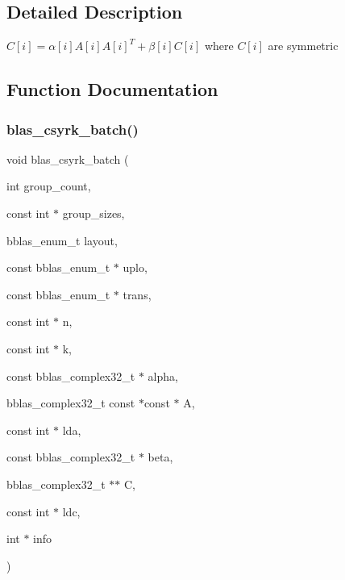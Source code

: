 \subsection{Detailed Description}
$ C[i] = \alpha[i] A[i] A[i]^T + \beta[i] C[i] $ where $ C[i] $ are symmetric 



\subsection{Function Documentation}
\mbox{\label{group__syrk__batch_ga94e86ba1afc5a916a21c81c36b69d7b8}} 
\subsubsection{\texorpdfstring{blas\+\_\+csyrk\+\_\+batch()}{blas\_csyrk\_batch()}}
{\footnotesize\ttfamily void blas\+\_\+csyrk\+\_\+batch (\begin{DoxyParamCaption}\item[{int}]{group\+\_\+count,  }\item[{const int $\ast$}]{group\+\_\+sizes,  }\item[{bblas\+\_\+enum\+\_\+t}]{layout,  }\item[{const bblas\+\_\+enum\+\_\+t $\ast$}]{uplo,  }\item[{const bblas\+\_\+enum\+\_\+t $\ast$}]{trans,  }\item[{const int $\ast$}]{n,  }\item[{const int $\ast$}]{k,  }\item[{const bblas\+\_\+complex32\+\_\+t $\ast$}]{alpha,  }\item[{bblas\+\_\+complex32\+\_\+t const $\ast$const $\ast$}]{A,  }\item[{const int $\ast$}]{lda,  }\item[{const bblas\+\_\+complex32\+\_\+t $\ast$}]{beta,  }\item[{bblas\+\_\+complex32\+\_\+t $\ast$$\ast$}]{C,  }\item[{const int $\ast$}]{ldc,  }\item[{int $\ast$}]{info }\end{DoxyParamCaption})}

